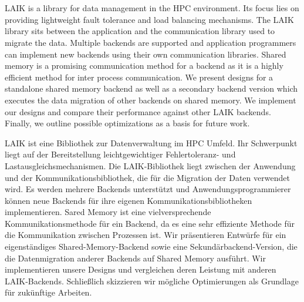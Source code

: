 \chapter{\abstractname}

LAIK is a library for data management in the HPC environment.
Its focus lies on providing lightweight fault tolerance and load balancing mechanisms.
The LAIK library sits between the application and the communication library used to migrate the data.
Multiple backends are supported and application programmers can implement new backends using their own communication libraries.
Shared memory is a promising communication method for a backend as it is a highly efficient method for inter process communication.
We present designs for a standalone shared memory backend as well as a secondary backend version which executes the data migration of other backends on shared memory.
We implement our designs and compare their performance against other LAIK backends.
Finally, we outline possible optimizations as a basis for future work.

\vspace{1cm}
\noindent LAIK ist eine Bibliothek zur Datenverwaltung im HPC Umfeld.
Ihr Schwerpunkt liegt auf der Bereitstellung leichtgewichtiger Fehlertoleranz- und Lastausgleichsmechanismen.
Die LAIK-Bibliothek liegt zwischen der Anwendung und der Kommunikationsbibliothek, die für die Migration der Daten verwendet wird.
Es werden mehrere Backends unterstützt und Anwendungsprogrammierer können neue Backends für ihre eigenen Kommunikationsbibliotheken implementieren.
Sared Memory ist eine vielversprechende Kommunikationsmethode für ein Backend, da es eine sehr effiziente Methode für die Kommunikation zwischen Prozessen ist.
Wir präsentieren Entwürfe für ein eigenständiges Shared-Memory-Backend sowie eine Sekundärbackend-Version, die die Datenmigration anderer Backends auf Shared Memory ausführt.
Wir implementieren unsere Designs und vergleichen deren Leistung mit anderen LAIK-Backends.
Schließlich skizzieren wir mögliche Optimierungen als Grundlage für zukünftige Arbeiten.